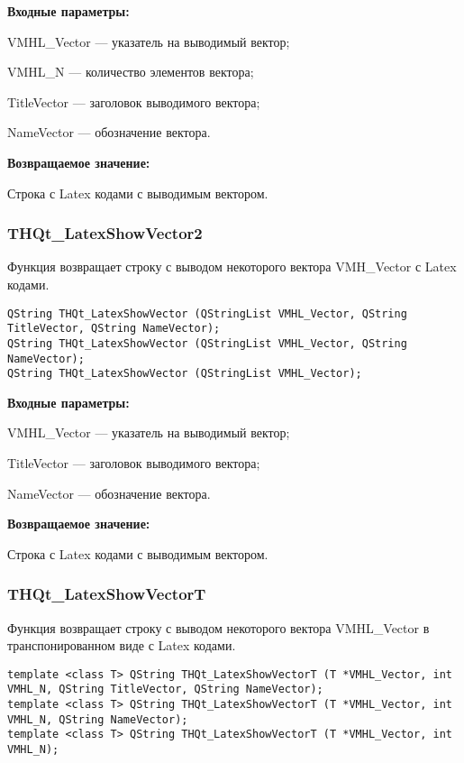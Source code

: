 \documentclass[a4paper,12pt]{article}
\begin{document}
\textbf{Входные параметры:}
 
    VMHL\_Vector --- указатель на выводимый вектор;
 
    VMHL\_N --- количество элементов вектора;
 
    TitleVector --- заголовок выводимого вектора;
 
    NameVector --- обозначение вектора.
	
\textbf{Возвращаемое значение:}

Строка с Latex кодами с выводимым вектором.


\subsubsection{THQt\_LatexShowVector2}\label{THQt_LatexShowVector2}

Функция возвращает строку с выводом некоторого вектора VMH\_Vector с Latex кодами.


\begin{lstlisting}[label=code_syntax_THQt_LatexShowVector2,caption=Синтаксис]
QString THQt_LatexShowVector (QStringList VMHL_Vector, QString TitleVector, QString NameVector);
QString THQt_LatexShowVector (QStringList VMHL_Vector, QString NameVector);
QString THQt_LatexShowVector (QStringList VMHL_Vector);

\end{lstlisting}

\textbf{Входные параметры:}
 
    VMHL\_Vector --- указатель на выводимый вектор;
 
    TitleVector --- заголовок выводимого вектора;
 
    NameVector --- обозначение вектора.
	
\textbf{Возвращаемое значение:}

Строка с Latex кодами с выводимым вектором.


\subsubsection{THQt\_LatexShowVectorT}\label{THQt_LatexShowVectorT}

Функция возвращает строку с выводом некоторого вектора VMHL\_Vector в транспонированном виде с Latex кодами.


\begin{lstlisting}[label=code_syntax_THQt_LatexShowVectorT,caption=Синтаксис]
template <class T> QString THQt_LatexShowVectorT (T *VMHL_Vector, int VMHL_N, QString TitleVector, QString NameVector);
template <class T> QString THQt_LatexShowVectorT (T *VMHL_Vector, int VMHL_N, QString NameVector);
template <class T> QString THQt_LatexShowVectorT (T *VMHL_Vector, int VMHL_N);

\end{lstlisting}
\end{document}
